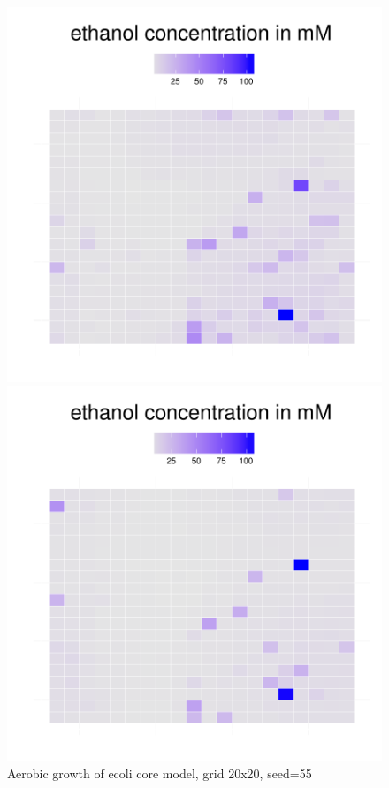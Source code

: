 \begin{figure}[h]
{\begin{minipage}[t]{0.3\textwidth}
  \end{minipage}
  \begin{minipage}[t]{0.3\textwidth}
    \includegraphics[width=\textwidth]{../results/ecoli_beijerinckii_20x20_seed5147_etoh55.pdf}
  \end{minipage}
  \begin{minipage}[t]{0.3\textwidth}
    \includegraphics[width=\textwidth]{../results/ecoli_beijerinckii_20x20_seed5147_etoh75.pdf}
  \end{minipage}
  }
  \caption{Aerobic growth of ecoli core model, grid 20x20, seed=55}
\end{figure}

